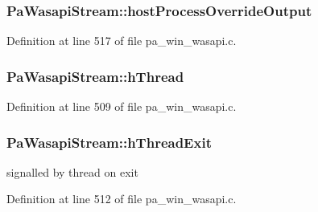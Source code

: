 \subsubsection[{\texorpdfstring{host\+Process\+Override\+Output}{hostProcessOverrideOutput}}]{ Pa\+Wasapi\+Stream\+::host\+Process\+Override\+Output}\hypertarget{struct_pa_wasapi_stream_ae0471e5b5c15f54c59c57980d9faec48}{}\label{struct_pa_wasapi_stream_ae0471e5b5c15f54c59c57980d9faec48}


Definition at line 517 of file pa\+\_\+win\+\_\+wasapi.\+c.

\subsubsection[{\texorpdfstring{h\+Thread}{hThread}}]{ Pa\+Wasapi\+Stream\+::h\+Thread}\hypertarget{struct_pa_wasapi_stream_ad3e65e6b5962b82233fbe966a676c286}{}\label{struct_pa_wasapi_stream_ad3e65e6b5962b82233fbe966a676c286}


Definition at line 509 of file pa\+\_\+win\+\_\+wasapi.\+c.

\subsubsection[{\texorpdfstring{h\+Thread\+Exit}{hThreadExit}}]{ Pa\+Wasapi\+Stream\+::h\+Thread\+Exit}\hypertarget{struct_pa_wasapi_stream_ad03150fdcbb572f9faf8fed472333e50}{}\label{struct_pa_wasapi_stream_ad03150fdcbb572f9faf8fed472333e50}


signalled by thread on exit 



Definition at line 512 of file pa\+\_\+win\+\_\+wasapi.\+c.

